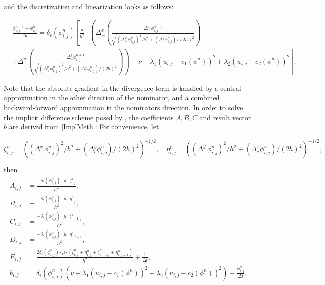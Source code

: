 and the discretization and linearization looks as follows:

\begin{equation}
  \begin{split}
    &\frac{\phi_{i,j}^{n+1}-\phi_{i,j}^n}{\Delta t} = \delta_\epsilon(\phi_{i,j}^n) \left[\frac{\mu}{h^2}\cdot 
\left(\Delta_-^x \left(\frac{\Delta_+^x\phi_{i,j}^{n+1}}{\sqrt{(\Delta_+^x\phi_{i,j}^n)^2/h^2 + (\Delta_c^y \phi_{i,j}^n)/(2h)^2}}\right)\right.\right.\\
    &\left.\left.+ \Delta_-^y \left(\frac{\Delta_+^y\phi_{i,j}^{n+1}}{\sqrt{(\Delta_+^y\phi_{i,j}^n)^2/h^2 + (\Delta_c ^x \phi_{i,j}^n)/(2h)^2}}\right)\right)
    - \nu - \lambda_1(u_{i,j} - c_1(\phi^n))^2 + \lambda_2(u_{i,j} - c_2(\phi^n))^2\right].
  \end{split}\label{ImplMeth}
\end{equation}

Note that the absolute gradient in the divergence term is handled by a central approximation in the other direction of the nominator, and a combined backward-forward approximation in the nominators direction.
In order to solve the implicit difference scheme posed by \cite{chan.01}, the coefficients $A,B,C$ and result vector $b$ are derived from \eqref{ImplMeth}:
For convenience, let

\begin{equation}
\zeta_{i,j}^n = \left((\Delta_+^x\phi_{i,j}^n)^2/h^2 + (\Delta_c^y \phi_{i,j}^n)/(2h)^2\right)^{-1/2},\quad
\eta_{i,j}^n = \left((\Delta_+^y\phi_{i,j}^n)^2/h^2 + (\Delta_c ^x \phi_{i,j}^n)/(2h)^2\right)^{-1/2},\label{zetaeta}
\end{equation}

then
\begin{align}
A_{i,j} &= \frac{-\delta_\epsilon(\phi_{i,j}^n)\cdot\mu\cdot \zeta_{i,j}^n}{h^2},\\
B_{i,j} &= \frac{-\delta_\epsilon(\phi_{i,j}^n)\cdot\mu\cdot\eta_{i,j}^n}{h^2},\\
C_{i,j} &= \frac{-\delta_\epsilon(\phi_{i,j}^n)\cdot\mu\cdot \zeta_{i-1,j}^n}{h^2},\\
D_{i,j} &= \frac{-\delta_\epsilon(\phi_{i,j}^n)\cdot\mu\cdot\eta_{i,j-1}^n}{h^2},\\
E_{i,j} &= \frac{2\delta_\epsilon(\phi_{i,j}^n)\cdot\mu\cdot(\zeta_{i,j}^n + \eta_{i,j}^n + \zeta_{i-1,j}^n +\eta_{i,j-1}^n)}{h^2}+\frac{1}{\Delta t},\\
b_{i,j} &= \delta_\epsilon(\phi_{i,j}^n)\left(\nu + \lambda_1(u_{i,j}-c_1(\phi^n))^2 - \lambda_2(u_{i,j}-c_2(\phi^n))^2\right) + \frac{\phi_{i,j}^n}{\Delta t}.
\end{align}


